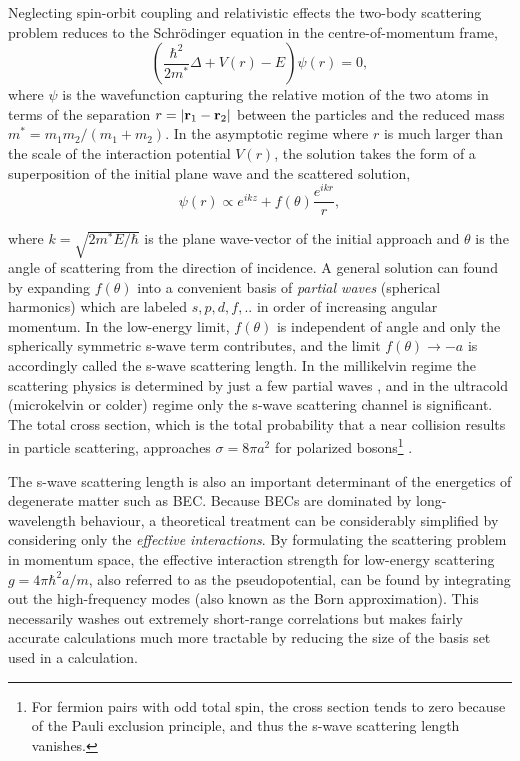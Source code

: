 	Neglecting spin-orbit coupling and relativistic effects the two-body scattering problem reduces to the Schr\"{o}dinger equation in the centre-of-momentum frame,
	\begin{equation}
	\left(\frac{\hbar^2}{2m^*}\Delta + V(r) - E\right)\psi(r) = 0,
	\end{equation}
	where $\psi$ is the wavefunction capturing the relative motion of the two atoms	in terms of the separation $r=|\textbf{r}_1-\textbf{r}_2|$ between the particles and the reduced mass $m^*=m_1m_2/(m_1+m_2)$.
	In the asymptotic regime where $r$ is much larger than the scale of the interaction potential $V(r)$, the solution takes the form of a superposition of the initial plane wave and the scattered solution,
	\begin{equation}
	\psi(r) \propto e^{ikz} + f(\theta)\frac{e^{ikr}}{r},
	\end{equation}

	where $k=\sqrt{2m^*E/\hbar}$ is the plane wave-vector of the initial approach and $\theta$ is the angle of scattering from the direction of incidence.
	A general solution can found by expanding $f(\theta)$ into a convenient basis of \emph{partial waves} (spherical harmonics) which are labeled $s,p,d,f,..$ in order of increasing angular momentum.
	In the low-energy limit, $f(\theta)$ is independent of angle and only the spherically symmetric s-wave term contributes, and the limit $f(\theta)\rightarrow-a$ is accordingly called the s-wave scattering length.
	In the millikelvin regime the scattering physics is determined by just a few partial waves \cite{McNamara07}, and in the ultracold (microkelvin or colder) regime only the s-wave scattering channel is significant.
	The total cross section, which is the total probability that a near collision results in particle scattering, approaches $\sigma=8\pi a^2$ for polarized bosons\footnote{For fermion pairs with odd total spin, the cross section tends to zero because of the Pauli exclusion principle, and thus the s-wave scattering length vanishes.} \cite{PitaevskiiStringari,Przybytek05}.
	

	The s-wave scattering length is also an important determinant of the energetics of degenerate matter such as BEC.
	Because BECs are dominated by long-wavelength behaviour, a theoretical treatment can be considerably simplified by considering only the \emph{effective interactions}.
	By formulating the scattering problem in momentum space, the effective interaction strength for low-energy scattering  $g=4\pi \hbar^2 a/m$, also referred to as the pseudopotential, can be found by integrating out the high-frequency modes (also known as the Born approximation).
	This necessarily washes out extremely short-range correlations but makes fairly accurate calculations much more tractable by reducing the size of the basis set used in a calculation.

